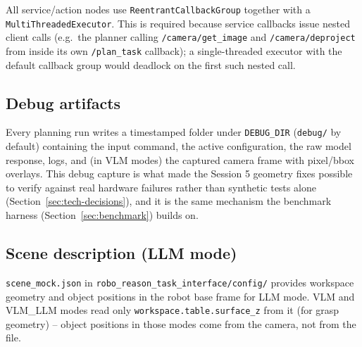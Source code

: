 All service/action nodes use \texttt{ReentrantCallbackGroup} together with a
\texttt{MultiThreadedExecutor}. This is required because service callbacks
issue nested client calls (e.g.\ the planner calling
\texttt{/camera/get\_image} and \texttt{/camera/deproject} from inside its own
\texttt{/plan\_task} callback); a single-threaded executor with the default
callback group would deadlock on the first such nested call.

\subsection{Debug artifacts}

Every planning run writes a timestamped folder under \texttt{DEBUG\_DIR}
(\texttt{debug/} by default) containing the input command, the active
configuration, the raw model response, logs, and (in VLM modes) the captured
camera frame with pixel/bbox overlays. This debug capture is what made the
Session 5 geometry fixes possible to verify against real hardware failures
rather than synthetic tests alone (Section~\ref{sec:tech-decisions}), and it
is the same mechanism the benchmark harness (Section~\ref{sec:benchmark})
builds on.

\subsection{Scene description (LLM mode)}

\texttt{scene\_mock.json} in \texttt{robo\_reason\_task\_interface/config/}
provides workspace geometry and object positions in the robot base frame for
LLM mode. VLM and VLM\_LLM modes read only \texttt{workspace.table.surface\_z}
from it (for grasp geometry) -- object positions in those modes come from the
camera, not from the file.
